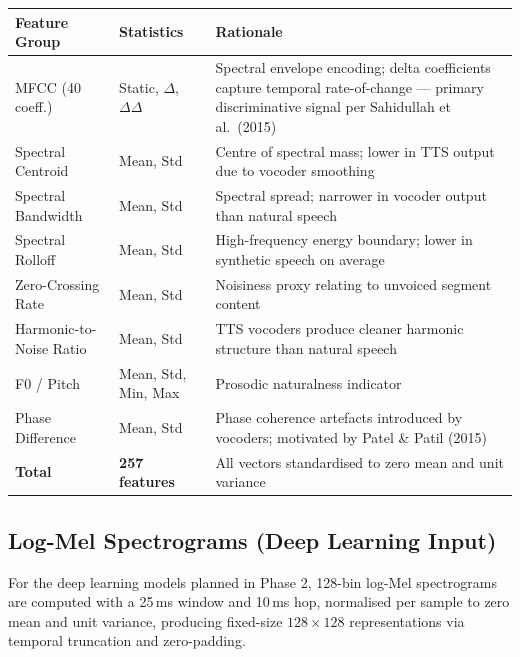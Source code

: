 \documentclass[12pt,a4paper]{report}
\begin{document}
\begin{center}
\begin{tabular}{L{3cm}L{2.8cm}L{7.2cm}}
  \toprule
  \color{white}\textbf{Feature Group} &
  \color{white}\textbf{Statistics} &
  \color{white}\textbf{Rationale} \\
  \midrule
  MFCC (40 coeff.) & Static, $\Delta$, $\Delta\Delta$ &
    Spectral envelope encoding; delta coefficients capture temporal rate-of-change ---
    primary discriminative signal per Sahidullah et al.\ (2015) \\
  Spectral Centroid & Mean, Std &
    Centre of spectral mass; lower in TTS output due to vocoder smoothing \\
  Spectral Bandwidth & Mean, Std &
    Spectral spread; narrower in vocoder output than natural speech \\
  Spectral Rolloff & Mean, Std &
    High-frequency energy boundary; lower in synthetic speech on average \\
  Zero-Crossing Rate & Mean, Std &
    Noisiness proxy relating to unvoiced segment content \\
  Harmonic-to-Noise Ratio & Mean, Std &
    TTS vocoders produce cleaner harmonic structure than natural speech \\
  F0 / Pitch & Mean, Std, Min, Max &
    Prosodic naturalness indicator \\
  Phase Difference & Mean, Std &
    Phase coherence artefacts introduced by vocoders; motivated by Patel \& Patil (2015) \\
  \midrule
  \textbf{Total} & \textbf{257 features} &
    All vectors standardised to zero mean and unit variance \\
  \bottomrule
\end{tabular}
\label{tab:features}
\end{center}

\subsection{Log-Mel Spectrograms (Deep Learning Input)}

For the deep learning models planned in Phase 2, 128-bin log-Mel spectrograms are
computed with a 25\,ms window and 10\,ms hop, normalised per sample to zero mean and
unit variance, producing fixed-size $128 \times 128$ representations via temporal
truncation and zero-padding.
\end{document}
